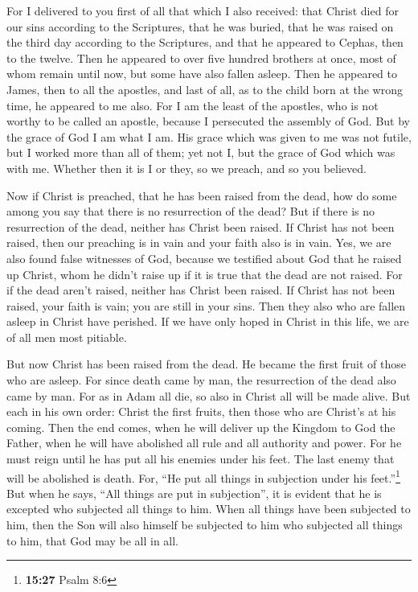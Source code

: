  For I delivered to you first of all that which I also
received: that Christ died for our sins according to the Scriptures,
 that he was buried, that he was raised on the third day
according to the Scriptures,  and that he appeared to
Cephas, then to the twelve.  Then he appeared to over five
hundred brothers at once, most of whom remain until now, but some have
also fallen asleep.  Then he appeared to James, then to
all the apostles,  and last of all, as to the child born
at the wrong time, he appeared to me also.  For I am the
least of the apostles, who is not worthy to be called an apostle,
because I persecuted the assembly of God.  But by the
grace of God I am what I am. His grace which was given to me was not
futile, but I worked more than all of them; yet not I, but the grace of
God which was with me.  Whether then it is I or they, so
we preach, and so you believed.

 Now if Christ is preached, that he has been raised from
the dead, how do some among you say that there is no resurrection of the
dead?  But if there is no resurrection of the dead,
neither has Christ been raised.  If Christ has not been
raised, then our preaching is in vain and your faith also is in vain.
 Yes, we are also found false witnesses of God, because
we testified about God that he raised up Christ, whom he didn't raise up
if it is true that the dead are not raised.  For if the
dead aren't raised, neither has Christ been raised.  If
Christ has not been raised, your faith is vain; you are still in your
sins.  Then they also who are fallen asleep in Christ
have perished.  If we have only hoped in Christ in this
life, we are of all men most pitiable.

 But now Christ has been raised from the dead. He became
the first fruit of those who are asleep.  For since death
came by man, the resurrection of the dead also came by man.
 For as in Adam all die, so also in Christ all will be
made alive.  But each in his own order: Christ the first
fruits, then those who are Christ's at his coming.  Then
the end comes, when he will deliver up the Kingdom to God the Father,
when he will have abolished all rule and all authority and power.
 For he must reign until he has put all his enemies under
his feet.  The last enemy that will be abolished is
death.  For, ``He put all things in subjection under his
feet.''\footnote{\textbf{15:27} Psalm 8:6} But when he says, ``All
things are put in subjection'', it is evident that he is excepted who
subjected all things to him.  When all things have been
subjected to him, then the Son will also himself be subjected to him who
subjected all things to him, that God may be all in all.

